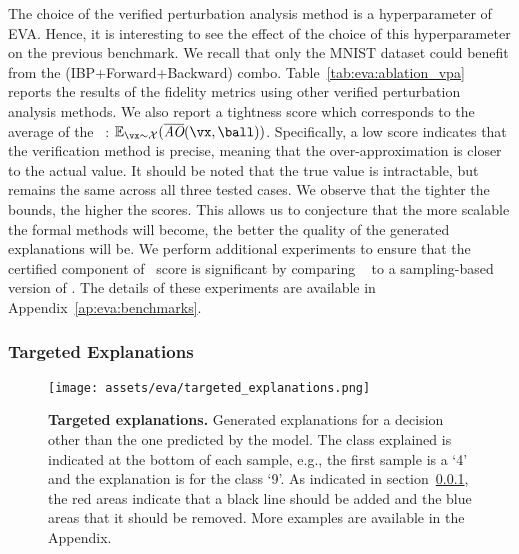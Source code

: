 The choice of the verified perturbation analysis method is a hyperparameter of EVA.
Hence, it is interesting to see the effect of the choice of this hyperparameter on the previous benchmark. 
We recall that only the MNIST dataset could benefit from the (IBP+Forward+Backward) combo. Table~\ref{tab:eva:ablation_vpa}  reports the results of the fidelity metrics using other verified perturbation analysis methods. We also report a tightness score which corresponds to the average of the \adv~: 
$\mathbb{E}_{\vx \sim \mathcal{X}}(\AOup(\vx, \ball))$.
Specifically, a low score indicates that the verification method is precise, meaning that the over-approximation is closer to the actual value. It should be noted that the true value is intractable, but remains the same across all three tested cases. We observe that the tighter the bounds, the higher the scores. This allows us to conjecture that the more scalable the formal methods will become, the better the quality of the generated explanations will be.
We perform additional experiments to ensure that the certified component of \eva~score is significant by comparing \eva~ to 
a sampling-based version of \eva. The details of these experiments are available in Appendix~\ref{ap:eva:benchmarks}.

\subsubsection{Targeted Explanations}
\label{sec:eva:targeted_explanations}

\begin{figure}[t!]
  \centering
  \texttt{[image: assets/eva/targeted\_explanations.png]}
  \caption{\textbf{Targeted explanations.} Generated explanations for a decision other than the one predicted by the model. The class explained is indicated at the bottom of each sample, e.g., the first sample is a `4' and the explanation is for the class `9'. As indicated in section~\ref{sec:eva:targeted_explanations}, the red areas indicate that a black line should be added and the blue areas that it should be removed. More examples are available in the Appendix.
  }
  \label{fig:eva:targeted_explanations}
\end{figure}

